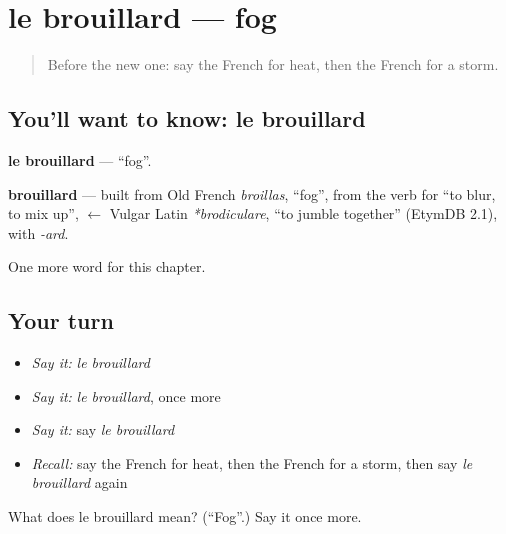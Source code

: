 \section[le brouillard]{le brouillard — fog}

\label{lesson:FR-C133-brouillard}



\begin{quote}
Before the new one: say the French for heat, then the French for a storm.
\end{quote}

\subsection*{You'll want to know: le brouillard}
\textbf{le brouillard} — \textquotedblleft{}fog\textquotedblright{}.

\begin{cousinweb}
\textbf{brouillard} — built from Old French \emph{broillas}, \textquotedblleft{}fog\textquotedblright{}, from the verb for \textquotedblleft{}to blur, to mix up\textquotedblright{}, $\leftarrow$ Vulgar Latin \emph{*brodiculare}, \textquotedblleft{}to jumble together\textquotedblright{} (EtymDB 2.1), with \emph{-ard}.
\end{cousinweb}

\begin{grammarlens}[title={What you've built}]
One more word for this chapter.
\end{grammarlens}

\subsection*{Your turn}
\begin{itemize}
\raggedright
  \item \emph{Say it:} \emph{le brouillard}
  \item \emph{Say it:} \emph{le brouillard}, once more
  \item \emph{Say it:} say \emph{le brouillard}
  \item \emph{Recall:} say the French for heat, then the French for a storm, then say \emph{le brouillard} again
\end{itemize}

\begin{tcolorbox}[breakable,colback=teal!4,colframe=teal!35!black,title={Before you move on}]
What does le brouillard mean? (\textquotedblleft{}Fog\textquotedblright{}.) Say it once more.
\end{tcolorbox}
